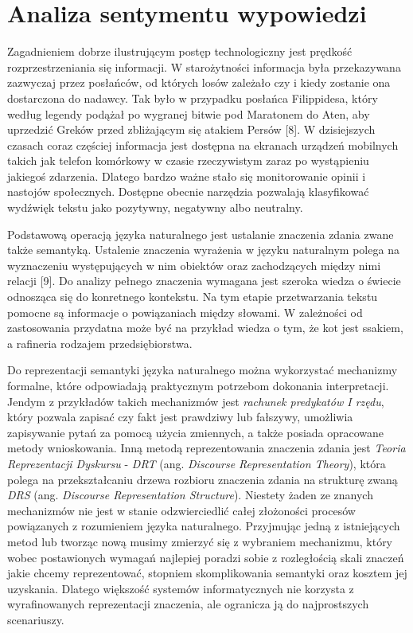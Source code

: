 \chapter{Analiza sentymentu wypowiedzi}

\qquad Zagadnieniem dobrze ilustrującym postęp technologiczny jest prędkość rozprzestrzeniania się informacji. W starożytności informacja była przekazywana zazwyczaj przez posłańców, od których losów zależało czy i kiedy zostanie ona dostarczona do nadawcy. Tak było w przypadku posłańca Filippidesa, który według legendy podążał po wygranej bitwie pod Maratonem do Aten, aby uprzedzić Greków przed zbliżającym się atakiem Persów [8]. W dzisiejszych czasach coraz częściej informacja jest dostępna na ekranach urządzeń mobilnych takich jak telefon komórkowy w czasie rzeczywistym zaraz po wystąpieniu jakiegoś zdarzenia. Dlatego bardzo ważne stało się monitorowanie opinii i nastojów społecznych. Dostępne obecnie narzędzia pozwalają klasyfikować wydźwięk tekstu jako pozytywny, negatywny albo neutralny.

Podstawową operacją języka naturalnego jest ustalanie znaczenia zdania zwane także semantyką. Ustalenie znaczenia wyrażenia w języku naturalnym polega na wyznaczeniu występujących w nim obiektów oraz zachodzących między nimi relacji [9]. Do analizy pełnego znaczenia wymagana jest szeroka wiedza o świecie odnosząca się do konretnego kontekstu. Na tym etapie przetwarzania tekstu pomocne są informacje o powiązaniach między słowami. W zależności od zastosowania przydatna może być na przykład wiedza o tym, że kot jest ssakiem, a rafineria rodzajem przedsiębiorstwa. 

Do reprezentacji semantyki języka naturalnego można wykorzystać mechanizmy formalne, które odpowiadają praktycznym potrzebom dokonania interpretacji. Jendym z przykładów takich mechanizmów jest \textit{rachunek predykatów I rzędu}, który pozwala zapisać czy fakt jest prawdziwy lub fałszywy, umożliwia zapisywanie pytań za pomocą użycia zmiennych, a także posiada opracowane metody wnioskowania. Inną metodą reprezentowania znaczenia zdania jest \textit{Teoria Reprezentacji Dyskursu} - \textit{DRT} (ang. \textit{Discourse Representation Theory}), która polega na przekształcaniu drzewa rozbioru znaczenia zdania na strukturę zwaną \textit{DRS} (ang. \textit{Discourse Representation Structure}). Niestety żaden ze znanych mechanizmów nie jest w stanie odzwierciedlić całej złożoności procesów powiązanych z rozumieniem języka naturalnego. Przyjmując jedną z istniejących metod lub tworząc nową musimy zmierzyć się z wybraniem mechanizmu, który wobec postawionych wymagań najlepiej poradzi sobie z rozległością skali znaczeń jakie chcemy reprezentować, stopniem skomplikowania semantyki oraz kosztem jej uzyskania. Dlatego większość systemów informatycznych nie korzysta z wyrafinowanych reprezentacji znaczenia, ale ogranicza ją do najprostszych scenariuszy.

